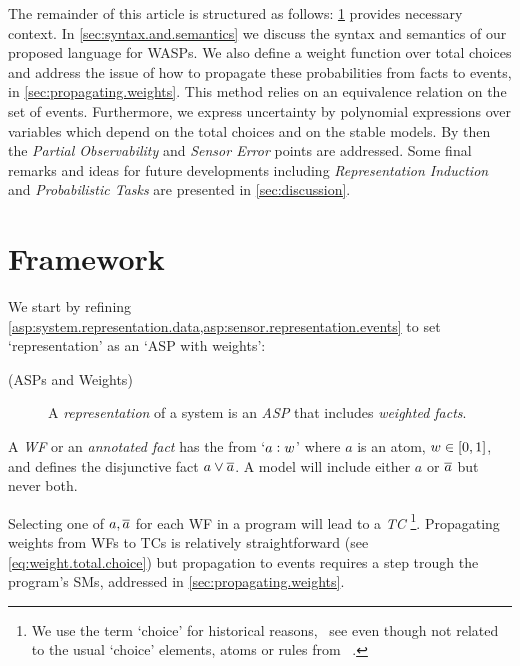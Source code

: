\documentclass[x11names]{tlp}
\renewcommand{\cite}{\citep}
\begin{document}
\noindent The remainder of this article is structured as follows: \cref{sec:framework} provides necessary context.
In \cref{sec:syntax.and.semantics} we discuss the syntax and semantics of our proposed language for \acfp{WASP}.
We also define a weight function over total choices and address the issue of how to propagate these probabilities from facts to events, in \cref{sec:propagating.weights}.
This method relies on an equivalence relation on the set of events.
Furthermore, we express uncertainty by polynomial expressions over variables which depend on the total choices and on the stable models. By then the \emph{Partial Observability} and \emph{Sensor Error} points are addressed.
Some final remarks and ideas for future developments including \emph{Representation Induction} and \emph{Probabilistic Tasks} are presented in \cref{sec:discussion}.

\section{Framework}
\label{sec:framework}

%
We start by refining \cref{asp:system.representation.data,asp:sensor.representation.events} to set `representation' as an `\ac{ASP} with weights':
\begin{assumption}\label{asp:wasp.represent.systems}
	\begin{description}
		\item[(\Aclp*{ASP} and Weights)] A \emph{representation} of a system is an \emph{\acl{ASP} }that includes \emph{weighted facts}.
	\end{description}
	A \emph{\acf{WF}} or an \emph{annotated fact} has the from `$a:w$' where $a$ is an atom, $w \in \intcc{0, 1}$, and defines the disjunctive fact $a \vee \overline{a}$. A model will include either $a$ or $\overline{a}$ but never both.	
\end{assumption}

Selecting one of $a, \overline{a}$ for each \ac{WF} in a program will lead to a \emph{\acf{TC}}
\footnote{We use the term `choice' for historical reasons, \eg\ see \cite{cozman2020joy} even though not related to the usual `choice' elements, atoms or rules from \eg\ \cite{calimeri2020aspcore}.}.
Propagating weights from \acp{WF} to \acp{TC} is relatively straightforward (see \cref{eq:weight.total.choice}) but propagation  to events requires a step trough the program's \aclp*{SM},  addressed in \cref{sec:propagating.weights}. 
\end{document}
